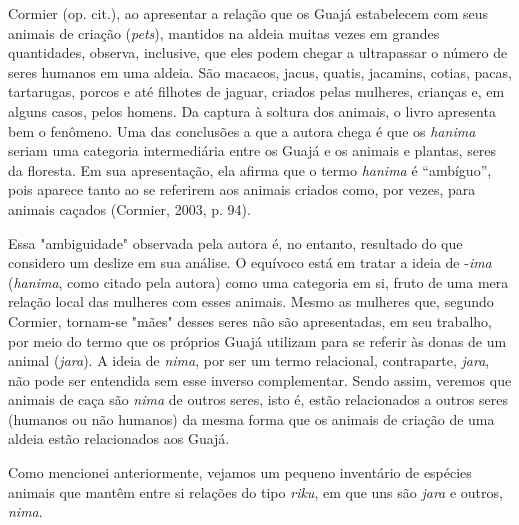 Cormier (op. cit.), ao apresentar a relação que os Guajá estabelecem com
seus animais de criação (\emph{pets}), mantidos na aldeia muitas vezes
em grandes quantidades, observa, inclusive, que eles podem chegar a
ultrapassar o número de seres humanos em uma aldeia. São macacos, jacus,
quatis, jacamins, cotias, pacas, tartarugas, porcos e até filhotes de
jaguar, criados pelas mulheres, crianças e, em alguns casos, pelos
homens. Da captura à soltura dos animais, o livro apresenta bem o
fenômeno. Uma das conclusões a que a autora chega é que os \emph{hanima}
seriam uma categoria intermediária entre os Guajá e os animais e
plantas, seres da floresta. Em sua apresentação, ela afirma que o termo
\emph{hanima} é ``ambíguo'', pois aparece tanto ao se referirem aos
animais criados como, por vezes, para animais caçados (Cormier, 2003, p.
94).

Essa "ambiguidade" observada pela autora é, no entanto, resultado do que
considero um deslize em sua análise. O equívoco está em tratar a ideia
de -\emph{ima} (\emph{hanima}, como citado pela autora) como uma
categoria em si, fruto de uma mera relação local das mulheres com esses
animais. Mesmo as mulheres que, segundo Cormier, tornam-se "mães" desses
seres não são apresentadas, em seu trabalho, por meio do termo que os
próprios Guajá utilizam para se referir às donas de um animal
(\emph{jara}). A ideia de \emph{nima}, por ser um termo relacional,
contraparte, \emph{jara}, não pode ser entendida sem esse inverso
complementar. Sendo assim, veremos que animais de caça são \emph{nima}
de outros seres, isto é, estão relacionados a outros seres (humanos ou
não humanos) da mesma forma que os animais de criação de uma aldeia
estão relacionados aos Guajá.

Como mencionei anteriormente, vejamos um pequeno inventário de espécies
animais que mantêm entre si relações do tipo \emph{riku}, em que uns são
\emph{jara} e outros, \emph{nima}.

